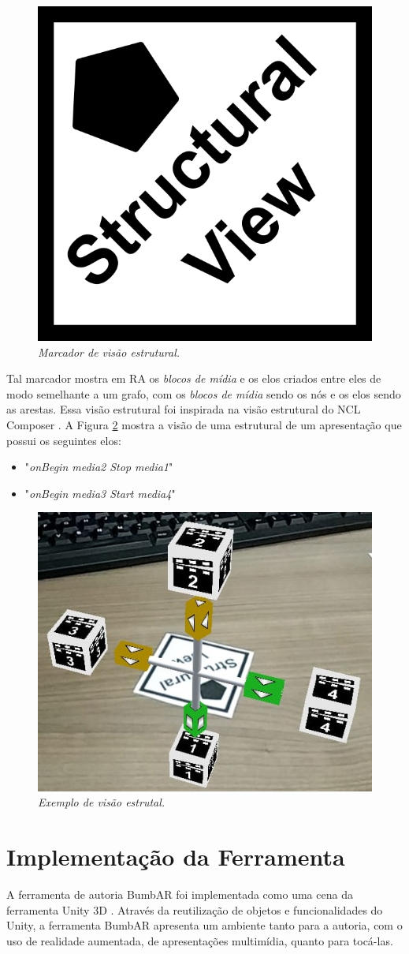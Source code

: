 \documentclass[../main.tex]{subfiles}
\begin{document}
\begin{figure}[!ht]
\centering
\includegraphics[width=0.2\linewidth]{IMG/Marcadores/estrutural_marker.png}
\caption{\textit{Marcador de visão estrutural.}}
\label{fig:estrutural_marker}
\end{figure}

Tal marcador mostra em RA os \emph{blocos de mídia} e os elos criados entre eles de modo semelhante a um grafo, com os \emph{blocos de mídia} sendo os nós e os elos sendo as arestas. Essa visão estrutural foi inspirada na visão estrutural do NCL Composer \cite{azevedo2014composer}. A Figura \ref{fig:estrutual} mostra a visão de uma estrutural de um apresentação que possui os seguintes elos:
\begin{itemize}
    \item "\emph{onBegin media2 Stop media1}"
    \item "\emph{onBegin media3 Start media4}"
\end{itemize}

\begin{figure}[!ht]
\centering
\includegraphics[width=0.45\linewidth]{IMG/estrutural.jpg}
\caption{\textit{Exemplo de visão estrutal.}}
\label{fig:estrutual}
\end{figure}

\section{Implementação da Ferramenta}
\label{sec:implementacao_prototipo}

A ferramenta de autoria BumbAR foi implementada como uma cena da ferramenta Unity 3D \cite{unity}. Através da reutilização de objetos e funcionalidades do Unity, a ferramenta BumbAR apresenta um ambiente tanto para a autoria, com o uso de realidade aumentada, de apresentações multimídia, quanto para tocá-las.
\end{document}
